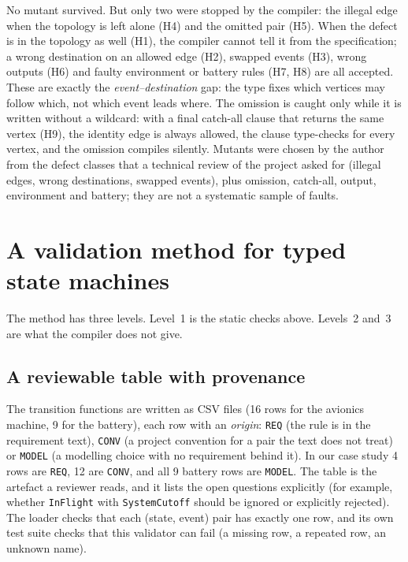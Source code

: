 \documentclass[review]{jfp-epi}
\newcommand{\code}[1]{\texttt{#1}}
\begin{document}
No mutant survived. But only two were stopped by the compiler: the illegal edge when the topology is left alone (H4) and the omitted pair (H5). When the defect is in the topology as well (H1), the compiler cannot tell it from the specification; a wrong destination on an allowed edge (H2), swapped events (H3), wrong outputs (H6) and faulty environment or battery rules (H7, H8) are all accepted. These are exactly the \emph{event--destination} gap: the type fixes which vertices may follow which, not which event leads where. The omission is caught only while it is written without a wildcard: with a final catch-all clause that returns the same vertex (H9), the identity edge is always allowed, the clause type-checks for every vertex, and the omission compiles silently. Mutants were chosen by the author from the defect classes that a technical review of the project asked for (illegal edges, wrong destinations, swapped events), plus omission, catch-all, output, environment and battery; they are not a systematic sample of faults.

\section{A validation method for typed state machines}
\label{sec:method}

The method has three levels. Level~1 is the static checks above. Levels~2 and~3 are what the compiler does not give.

\subsection{A reviewable table with provenance}

The transition functions are written as CSV files (16 rows for the avionics machine, 9 for the battery), each row with an \emph{origin}: \texttt{REQ} (the rule is in the requirement text), \texttt{CONV} (a project convention for a pair the text does not treat) or \texttt{MODEL} (a modelling choice with no requirement behind it). In our case study 4 rows are \texttt{REQ}, 12 are \texttt{CONV}, and all 9 battery rows are \texttt{MODEL}. The table is the artefact a reviewer reads, and it lists the open questions explicitly (for example, whether \code{InFlight} with \code{SystemCutoff} should be ignored or explicitly rejected). The loader checks that each (state, event) pair has exactly one row, and its own test suite checks that this validator can fail (a missing row, a repeated row, an unknown name).
\end{document}
